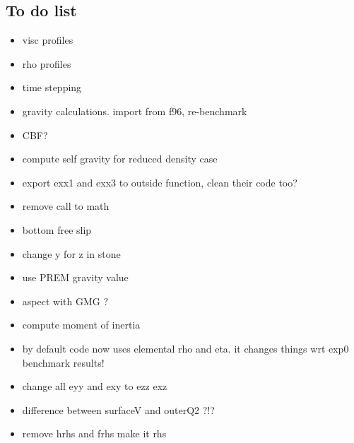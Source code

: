 \documentclass[a4paper,12pt]{article}
\begin{document}
\subsection{To do list}
\begin{itemize}
\item visc profiles
\item rho profiles
\item time stepping
\item gravity calculations. import from f96, re-benchmark
\item CBF? 
\item compute self gravity for reduced density case 
\item export exx1 and exx3 to outside function, clean their code too? 
\item remove call to math 
\item bottom free slip 
\item change y for z in stone
\item use PREM gravity value
\item aspect with GMG ?
\item compute moment of inertia
\item by default code now uses elemental rho and eta. it changes things wrt exp0 benchmark results!
\item change all eyy and exy to ezz exz
\item difference between surfaceV and outerQ2 ?!?
\item remove hrhs and frhs make it rhs
\end{itemize}




 
\end{document}
